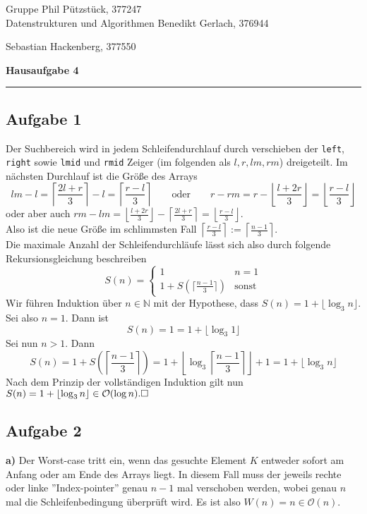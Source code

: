 \documentclass[a4paper,graphics,11pt]{article}
\newcommand{\aufgabe}[1]{\subsection*{Aufgabe #1}}
\begin{document}
\noindent Gruppe              \hfill Phil Pützstück, 377247\\
\noindent Datenstrukturen und Algorithmen \hfill Benedikt Gerlach, 376944\\
\strut\hfill Sebastian Hackenberg, 377550\\
\begin{center}
	\LARGE{\textbf{Hausaufgabe 4}}
\end{center}
\begin{center}
\rule[0.1ex]{\textwidth}{1pt}
\end{center}

\aufgabe{1}
Der Suchbereich wird in jedem Schleifendurchlauf durch verschieben der \texttt{left}, \texttt{right} sowie
\texttt{lmid} und \texttt{rmid} Zeiger (im folgenden als $l, r, lm, rm$) dreigeteilt. Im nächsten Durchlauf ist die Größe des Arrays
$$
    lm - l = \left\lceil \frac{2l + r}{3} \right\rceil - l
    = \left\lceil \frac{r - l}{3} \right\rceil
    \qquad \text{oder}\qquad
    r - rm = r - \left\lfloor \frac{l + 2r}{3} \right\rfloor
    = \left\lfloor \frac{r - l}{3} \right\rfloor
$$
oder aber auch
$rm - lm = \left\lfloor \frac{l + 2r}{3} \right\rfloor - \left\lceil \frac{2l + r}{3} \right\rceil
= \left\lfloor\frac{r - l}{3} \right\rfloor$.\\
Also ist die neue Größe im schlimmsten Fall
$\left\lceil \frac{r - l}{3} \right\rceil := \left\lceil\frac{n-1}{3}\right\rceil$.\\
Die maximale Anzahl der Schleifendurchläufe lässt sich also durch folgende Rekursionsgleichung beschreiben
$$
    S(n) = \begin{cases}
        1 & n = 1\\
        1 + S(\lceil\frac{n-1}{3}\rceil) & \text{sonst}
    \end{cases}
$$
Wir führen Induktion über $n \in \mathbb{N}$ mit der Hypothese, dass $S(n) = 1 + \lfloor\log_3 n\rfloor$.\\
Sei also $n = 1$. Dann ist
$$
    S(n) = 1 = 1 + \lfloor \log_3 1\rfloor
$$
Sei nun $n > 1$. Dann
$$
    S(n)
    = 1 + S\left(\left\lceil\frac{n-1}{3}\right\rceil\right)
    = 1 + \left\lfloor\log_3\left\lceil\frac{n-1}{3}\right\rceil\right\rfloor + 1
    = 1 + \lfloor \log_3 n\rfloor
$$
Nach dem Prinzip der vollständigen Induktion gilt nun $S(n) = 1 + \lfloor\log_3 n\rfloor \in \mathcal{O}(\log n).\hfill\square$
\aufgabe{2}
\textbf{a)}
Der Worst-case tritt ein, wenn das gesuchte Element $K$ entweder sofort am Anfang oder am Ende des
Arrays liegt. In diesem Fall muss der jeweils rechte oder linke ''Index-pointer'' genau $n-1$
mal verschoben werden, wobei genau $n$ mal die Schleifenbedingung überprüft wird.
Es ist also $W(n) = n\in \mathcal{O}(n)$.
\end{document}
